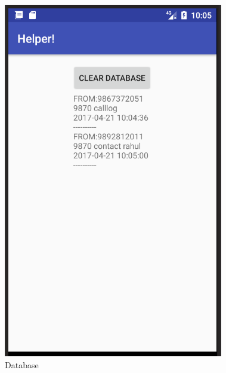 			\begin{figure}[h!]
				\centering	
			\includegraphics[scale=0.8]{3.png} %
			\caption{Database}
			\label{fig:8} %
			
		\end{figure} 
	
